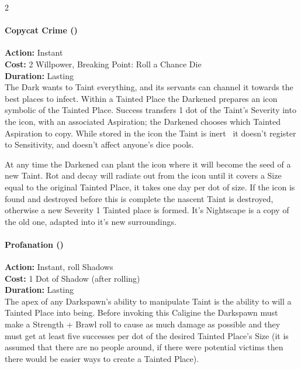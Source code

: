 \begin{multicols}{2}
\paragraph*{Copycat Crime (\textbullet\textbullet\textbullet\textbullet)}

\noindent \textbf{Action:} Instant \\

\noindent \textbf{Cost:} 2 Willpower, Breaking Point: Roll a Chance Die\\

\noindent \textbf{Duration:} Lasting \\

\noindent The Dark wants to Taint everything, and its servants can channel it towards the best places to infect. Within a Tainted Place the Darkened prepares an icon symbolic of the Tainted Place. Success transfers 1 dot of the Taint's Severity into the icon, with an associated Aspiration; the Darkened chooses which Tainted Aspiration to copy. While stored in the icon the Taint is inert \textemdash\, it doesn't register to Sensitivity, and doesn't affect anyone's dice pools. 

At any time the Darkened can plant the icon where it will become the seed of a new Taint. Rot and decay will radiate out from the icon until it covers a Size equal to the original Tainted Place, it takes one day per dot of size. If the icon is found and destroyed before this is complete the nascent Taint is destroyed, otherwise a new Severity 1 Tainted place is formed. It's Nightscape is a copy of the old one, adapted into it's new surroundings. \\ 

\paragraph*{Profanation (\textbullet\textbullet\textbullet\textbullet\textbullet)} 

\noindent \textbf{Action:} Instant, roll Shadows\\

\noindent \textbf{Cost:} 1 Dot of Shadow (after rolling)\\

\noindent \textbf{Duration:} Lasting \\

\noindent  The apex of any Darkspawn's ability to manipulate Taint is the ability to will a Tainted Place into being. Before invoking this Caligine the Darkspawn must make a Strength + Brawl roll to cause as much damage as possible and they must get at least five successes per dot of the desired Tainted Place's Size (it is assumed that there are no people around, if there were potential victims then there would be easier ways to create a Tainted Place).


\end{multicols}
